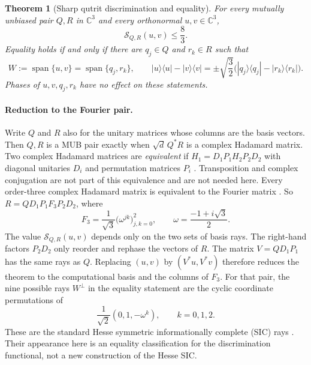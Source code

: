 \documentclass[11pt,a4paper]{article}
\numberwithin{equation}{section}
\newtheorem{theorem}{Theorem}[section]
\theoremstyle{remark}\newtheorem{remark}[theorem]{Remark}
\newcommand{\C}{\mathbb C}\newcommand{\R}{\mathbb R}
\DeclareMathOperator{\spanop}{span}
\newcommand{\proj}[1]{|#1\rangle\langle #1|}
\begin{document}
\begin{theorem}[Sharp qutrit discrimination and equality]\label{thm:qutrit}
For every mutually unbiased pair $Q,R$ in $\C^3$ and every orthonormal $u,v\in\C^3$,
\begin{equation}
\mathcal S_{Q,R}(u,v)\le\frac83.
\label{eq:sharp}
\end{equation}
Equality holds if and only if there are $q_j\in Q$ and $r_k\in R$ such that
\begin{equation}
W:=\spanop\{u,v\}=\spanop\{q_j,r_k\},\qquad
\proj{u}-\proj{v}=\pm\sqrt{\frac32}\bigl(\proj{q_j}-\proj{r_k}\bigr).
\label{eq:equality}
\end{equation}
Phases of $u,v,q_j,r_k$ have no effect on these statements.
\end{theorem}

\paragraph{Reduction to the Fourier pair.}
Write $Q$ and $R$ also for the unitary matrices whose columns are the basis vectors. Then $Q,R$ is a MUB pair exactly when $\sqrt d\,Q^*R$ is a complex Hadamard matrix. Two complex Hadamard matrices are \emph{equivalent} if $H_1=D_1P_1H_2P_2D_2$ with diagonal unitaries $D_i$ and permutation matrices $P_i$ \cite[Definition~2.2, equation~(5)]{tadej}. Transposition and complex conjugation are not part of this equivalence and are not needed here. Every order-three complex Hadamard matrix is equivalent to the Fourier matrix \cite[Section~5.3]{tadej}. So $R=QD_1P_1F_3P_2D_2$, where
\begin{equation}
F_3=\frac1{\sqrt3}\bigl(\omega^{jk}\bigr)_{j,k=0}^{2},\qquad
\omega=\frac{-1+i\sqrt3}{2}.
\end{equation}
The value $\mathcal S_{Q,R}(u,v)$ depends only on the two sets of basis rays. The right-hand factors $P_2D_2$ only reorder and rephase the vectors of $R$. The matrix $V=QD_1P_1$ has the same rays as $Q$. Replacing $(u,v)$ by $(V^*u,V^*v)$ therefore reduces the theorem to the computational basis and the columns of $F_3$. For that pair, the nine possible rays $W^\perp$ in the equality statement are the cyclic coordinate permutations of
\begin{equation}
\frac1{\sqrt2}(0,1,-\omega^k),\qquad k=0,1,2.
\label{eq:hesse}
\end{equation}
These are the standard Hesse symmetric informationally complete (SIC) rays \cite{stacey}. Their appearance here is an equality classification for the discrimination functional, not a new construction of the Hesse SIC.
\end{document}
